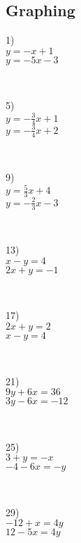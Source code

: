 \subsection{Graphing}\par

{}

\begin{multicols}{4}
  1)\\
	$y = - x + 1$\\
	$y = - 5 x - 3$\par
  ~\par
  5)\\
  $y = - \frac{3}{4} x + 1$\\
	$y = - \frac{3}{4} x + 2$\par
  ~\par
  9)\\
  $y = \frac{5}{3} x + 4$\\
	$y = - \frac{2}{3} x - 3$\par
  ~\par
  13)\\
  $x - y = 4$\\
	$2 x + y = - 1$\par
  ~\par
  17)\\
  $2 x + y = 2$\\
	$x - y = 4$\par
  ~\par
  21)\\
  $9y+6x=36$\\
	$3y-6x=-12$\par
  ~\par
  25)\\
  $3 + y = - x$\\
	$- 4 - 6 x = - y$\par
  ~\par
  29)\\
  $- 12 + x = 4 y$\\
	$12 - 5 x = 4 y$\par
  ~\par
  ~\par
  ~\par


\end{multicols}
